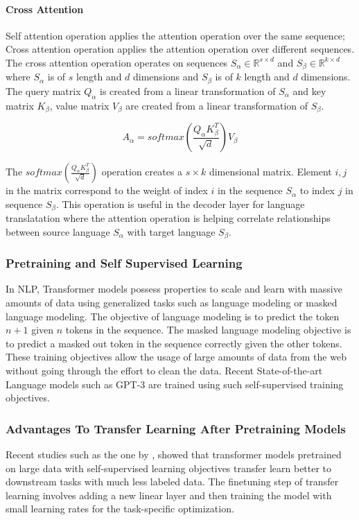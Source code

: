 \paragraph{Cross Attention}
\label{relatedwork:background:transformer:cross-attention}
Self attention operation applies the attention operation over the same sequence; Cross attention \parencite{tsai2019multimodal} operation applies the attention operation over different sequences. The cross attention operation operates on sequences $S_\alpha \in \mathbb{R}^{s \times d}$ and $S_\beta \in \mathbb{R}^{k \times d}$ where $S_\alpha$ is of $s$ length and $d$ dimensions and $S_\beta$ is of $k$ length and $d$ dimensions. The query matrix $Q_\alpha$ is created from a linear transformation of $S_\alpha$ and key matrix $K_\beta$, value matrix $V_\beta$ are created from a linear transformation of $S_\beta$. 

$$A_\alpha=softmax(\frac{Q_{\alpha}K_{\beta}^{T}}{\sqrt{d}})V_{\beta}$$

The $softmax(\frac{Q_{\alpha}K_{\beta}^{T}}{\sqrt{d}})$ operation creates a $s \times k$ dimensional matrix. Element ${i,j}$ in the matrix correspond to the weight of index $i$ in the sequence $S_\alpha$ to index $j$ in sequence $S_\beta$. This operation is useful in the decoder layer for language translatation where the attention operation is helping correlate relationships between source language $S_\alpha$ with target language $S_\beta$. 

\subsubsection{Pretraining and Self Supervised Learning}
In NLP, Transformer models possess properties to scale and learn with massive amounts of data using generalized tasks such as language modeling or masked language modeling. The objective of language modeling is to predict the token $n+1$ given $n$ tokens in the sequence. The masked language modeling objective is to predict a masked out token in the sequence correctly given the other tokens. These training objectives allow the usage of large amounts of data from the web without going through the effort to clean the data. Recent State-of-the-art Language models such as GPT-3 \parencite{brown2020language} are trained using such self-supervised training objectives. 

\subsubsection{Advantages To Transfer Learning After Pretraining Models}
Recent studies such as the one by \cite{hernandez2021scaling}, showed that transformer models pretrained on large data with self-supervised learning objectives transfer learn better to downstream tasks with much less labeled data. The finetuning step\parencite{howard2018universal} of transfer learning involves adding a new linear layer and then training the model with small learning rates for the task-specific optimization. 


